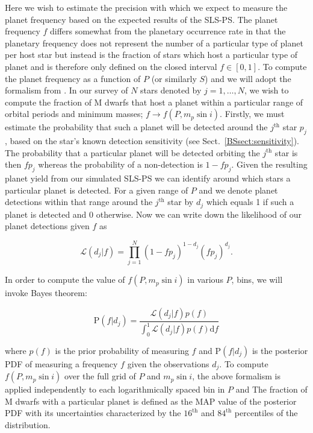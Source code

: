 Here we wish to estimate the precision with which we expect to measure the
planet frequency based on the expected results of the SLS-PS. The planet frequency
$f$ differs somewhat from the planetary occurrence rate in that the planetary frequency does not
represent the number of a particular type of planet per host star but instead is the fraction
of stars which host a particular type of planet and is therefore only defined on the closed
interval $f \in [0,1]$.
To compute the planet frequency as a function of $P$ (or similarly $S$) and \msini{,}
we will adopt the formalism from \cite{carson06, lafreniere07b}. In our survey of $N$
stars denoted by $j=1,\dots,N$, we wish to compute the fraction of M dwarfs that host
a planet within a particular range of orbital periods and minimum masses; $f \to f(P,m_p\sin{i})$.
Firstly, we must estimate the probability that such a planet will be detected around
the $j^{\text{th}}$ star $p_j$, based on the star's known detection sensitivity (see
Sect.~\ref{BSsect:sensitivity}). The probability that a particular planet will be detected orbiting
the $j^{\text{th}}$ star is then $fp_j$ whereas the probability of a non-detection is $1-fp_j$.
Given the resulting planet yield from our simulated SLS-PS we can identify around which stars
a particular planet is detected. For a given range of $P$ and \msini{,} we denote
planet detections within that range around the $j^{\text{th}}$ star by $d_j$ which equals 1
if such a planet is detected and 0 otherwise. Now we can write down the likelihood of our
planet detections given $f$ as

\begin{equation}
  \mathcal{L}(d_j|f) = \prod_{j=1}^{N} (1-fp_j)^{1-d_j} (fp_j)^{d_j}.
  \label{BSeq:freqlike}
\end{equation}

In order to compute the value of $f(P,m_p\sin{i})$ in various $P$,\msini{} bins,
we will invoke Bayes theorem:

\begin{equation}
  \text{P}(f|d_j) = \frac{\mathcal{L}(d_j|f) p(f)}{\int_{0}^{1} \mathcal{L}(d_j|f) p(f) \text{d}f}
  \label{BSeq:freqpost}
\end{equation}

\noindent where $p(f)$ is the prior probability of measuring $f$ and 
P$(f|d_j)$ is the posterior PDF of measuring a frequency $f$ given the
observations $d_j$. To compute $f(P,m_p\sin{i})$ over the full grid of $P$ and
$m_p\sin{i}$, the above formalism is applied independently to each logarithmically spaced bin in
$P$ and  The fraction of M dwarfs with a particular planet is defined as the
MAP value of the posterior PDF with its uncertainties characterized by the
$16^{\text{th}}$ and $84^{\text{th}}$ percentiles of the distribution.

